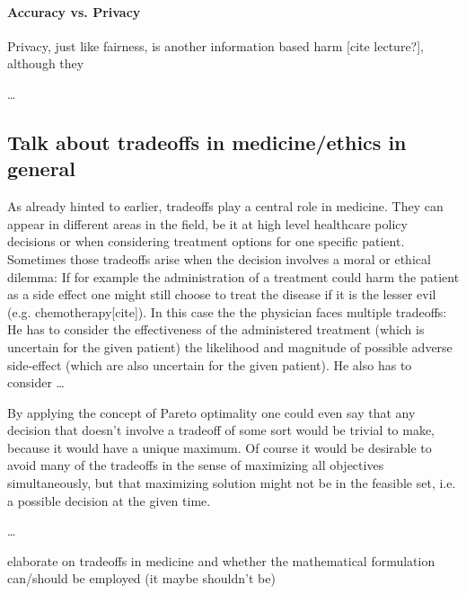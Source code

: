 	\paragraph{Accuracy vs. Privacy}
	Privacy, just like fairness, is another information based harm [cite lecture?], although they 

	\dots



	\subsection{Talk about tradeoffs in medicine/ethics in general}
	As already hinted to earlier, tradeoffs play a central role in medicine.
	They can appear in different areas in the field, be it at high level healthcare policy decisions or when considering treatment options for one specific patient.
	Sometimes those tradeoffs arise when the decision involves a moral or ethical dilemma:
	If for example the administration of a treatment could harm the patient as a side effect one might still choose to treat the disease if it is the lesser evil (e.g. chemotherapy[cite]).
	In this case the the physician faces multiple tradeoffs:
	He has to consider the effectiveness of the administered treatment (which is uncertain for the given patient) the likelihood and magnitude of possible adverse side-effect (which are also uncertain for the given patient).
	He also has to consider \dots
	
	By applying the concept of Pareto optimality one could even say that any decision that doesn't involve a tradeoff of some sort would be trivial to make, because it would have a unique maximum.
	Of course it would be desirable to avoid many of the tradeoffs in the sense of maximizing all objectives simultaneously, but that maximizing solution might not be in the feasible set, i.e. a possible decision at the given time.

	\dots

	elaborate on tradeoffs in medicine and whether the mathematical formulation can/should be employed (it maybe shouldn't be)
